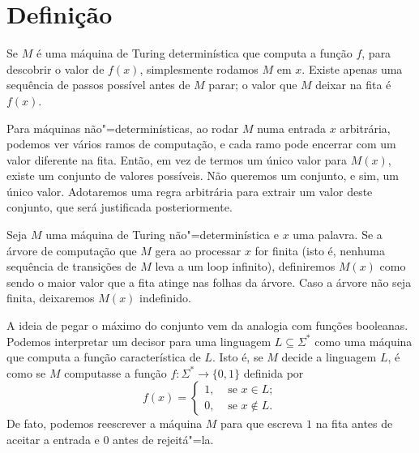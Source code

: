 \section{Definição}

Se $M$ é uma máquina de Turing determinística que computa a função $f$,
para descobrir o valor de $f(x)$,
simplesmente rodamos $M$ em $x$.
Existe apenas uma sequência de passos possível antes de $M$ parar;
o valor que $M$ deixar na fita é $f(x)$.

Para máquinas não"=determinísticas,
ao rodar $M$ numa entrada $x$ arbitrária,
podemos ver vários ramos de computação,
e cada ramo pode encerrar com um valor diferente na fita.
Então, em vez de termos um único valor para $M(x)$,
existe um conjunto de valores possíveis.
Não queremos um conjunto, e sim, um único valor.
Adotaremos uma regra arbitrária para extrair um valor deste conjunto,
que será justificada posteriormente.

\begin{definition}[Função não"=determinística\footnotemark]
    Seja $M$
    uma máquina de Turing não"=determinística
    e $x$ uma palavra.
    Se a árvore de computação que $M$ gera ao processar $x$ for finita
    (isto é, nenhuma sequência de transições de $M$ leva a um loop infinito),
    definiremos $M(x)$ como sendo o maior valor que a fita atinge
    nas folhas da árvore.
    Caso a árvore não seja finita, deixaremos $M(x)$ indefinido.
\end{definition}

A ideia de pegar o máximo do conjunto vem da analogia com funções booleanas.
Podemos interpretar um decisor para uma linguagem $L \subseteq \Sigma^*$
como uma máquina que computa a função característica de $L$.
Isto é,
se $M$ decide a linguagem $L$,
é como se $M$ computasse a função $f : \Sigma^* \rightarrow \{0, 1\}$
definida por
\begin{equation*}
    f(x) =
    \begin{cases}
        1,& \text{ se } x \in L; \\
        0,& \text{ se } x \notin L.
    \end{cases}
\end{equation*}
De fato, podemos reescrever a máquina $M$
para que escreva $1$ na fita antes de aceitar a entrada
e $0$ antes de rejeitá"=la.

